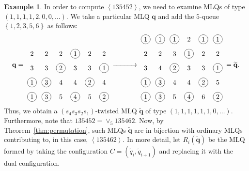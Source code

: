 \documentclass[reqno]{amsart}
\newcommand{\0}{\phantom{c}}
\newcommand{\swt}[1]{\left\langle #1 \right\rangle} %
\newcommand{\merge}[1]{\vee_{#1}} %
\newcommand{\qq}{\mathbf{q}}
\newcommand{\set}[1]{\left\{ #1 \right\}}
\theoremstyle{plain}
\theoremstyle{definition}
\newtheorem{example}[thm]{Example}
\numberwithin{equation}{section}
\begin{document}
\begin{example}
In order to compute $\swt{135452}$, we need to examine MLQs of type $(1,1,1,1, 2, 0, 0, \ldots)$.
We take a particular MLQ $\qq$ and add the $5$-queue $\set{1,2,3,5,6}$ as follows:
\[
\qq = \;
\begin{tikzpicture}[baseline=66,scale=0.75,every node/.style={inner sep=2pt}]
\node at (0, 4){2};\node at (1, 4){2};\node at (2, 4){2};\node[circle, draw=black] at (3, 4){1};\node at (4, 4){2};\node at (5, 4){2};\node at (0, 3){3};\node at (1, 3){3};\node[circle, draw=black] at (2, 3){2};\node at (3, 3){3};\node at (4, 3){3};\node[circle, draw=black] at (5, 3){1};\node[circle, draw=black] at (0, 2){1};\node[circle, draw=black] at (1, 2){3};\node at (2, 2){4};\node at (3, 2){4};\node[circle, draw=black] at (4, 2){2};\node at (5, 2){4};\node[circle, draw=black] at (0, 1){1};\node[circle, draw=black] at (1, 1){3};\node at (2, 1){5};\node[circle, draw=black] at (3, 1){4};\node at (4, 1){5};\node[circle, draw=black] at (5, 1){2};
\end{tikzpicture}
\; \xrightarrow{\hspace{30pt}} \;
\begin{tikzpicture}[baseline=66,scale=0.75,every node/.style={inner sep=2pt}]
\node[circle, draw=black] at (0, 5){1};\node[circle, draw=black] at (1, 5){1};\node[circle, draw=black] at (2, 5){1};\node at (3, 5){2};\node[circle, draw=black] at (4, 5){1};\node[circle, draw=black] at (5, 5){1};\node at (0, 4){2};\node at (1, 4){2};\node at (2, 4){3};\node[circle, draw=black] at (3, 4){1};\node at (4, 4){2};\node at (5, 4){2};\node at (0, 3){3};\node at (1, 3){4};\node[circle, draw=black] at (2, 3){2};\node at (3, 3){3};\node at (4, 3){3};\node[circle, draw=black] at (5, 3){1};\node[circle, draw=black] at (0, 2){1};\node[circle, draw=black] at (1, 2){3};\node at (2, 2){4};\node at (3, 2){4};\node[circle, draw=black] at (4, 2){2};\node at (5, 2){5};\node[circle, draw=black] at (0, 1){1};\node[circle, draw=black] at (1, 1){3};\node at (2, 1){5};\node[circle, draw=black] at (3, 1){4};\node at (4, 1){6};\node[circle, draw=black] at (5, 1){2};
\end{tikzpicture}
\; = \widetilde{\qq}.
\]
Thus, we obtain a $(s_4 s_3 s_2 s_1)$-twisted MLQ $\widetilde{\qq}$ of type $(1, 1, 1, 1, 1, 1, 0, \ldots)$.
Furthermore, note that $135452 = \merge{5} 135462$.
Now, by Theorem~\ref{thm:permutation}, such MLQs $\widetilde{\qq}$ are in bijection with ordinary MLQs contributing to, in this case, $\swt{135462}$.
In more detail, let $R_i(\widetilde{\qq})$ be the MLQ formed by taking the configuration $C = (\widetilde{q}_i, \widetilde{q}_{i+1})$ and replacing it with the dual configuration.

\end{example}
\end{document}
